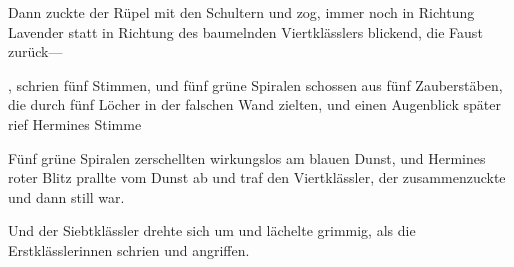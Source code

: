 Dann zuckte der Rüpel mit den Schultern und zog, immer noch in Richtung Lavender statt in Richtung des baumelnden Viertklässlers blickend, die Faust zurück—

 , schrien fünf Stimmen, und fünf grüne Spiralen schossen aus fünf Zauberstäben, die durch fünf Löcher in der falschen Wand zielten, und einen Augenblick später rief Hermines Stimme 

Fünf grüne Spiralen zerschellten wirkungslos am blauen Dunst, und Hermines roter Blitz prallte vom Dunst ab und traf den Viertklässler, der zusammenzuckte und dann still war.

Und der Siebtklässler drehte sich um und lächelte grimmig, als die Erstklässlerinnen schrien und angriffen.

\later


